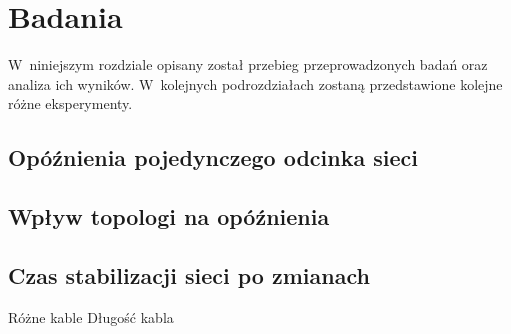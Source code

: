 \section{Badania}
W~niniejszym rozdziale opisany został przebieg przeprowadzonych badań oraz analiza ich wyników. W~kolejnych podrozdziałach zostaną przedstawione kolejne różne eksperymenty. 

\subsection{Opóźnienia pojedynczego odcinka sieci}
\subsection{Wpływ topologi na opóźnienia}
\subsection{Czas stabilizacji sieci po zmianach}

Różne kable
Długość kabla
